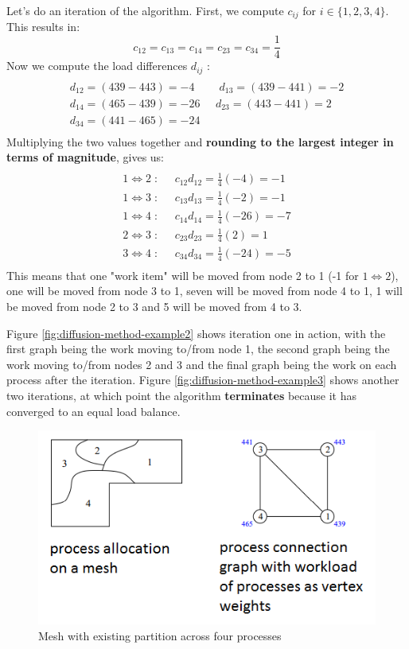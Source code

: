\documentclass{article}
\begin{document}
Let's do an iteration of the algorithm. First, we compute $c_{ij}$ for $i \in \lbrace 1, 2, 3, 4 \rbrace$. This results in:
\begin{equation}
	c_{12} = c_{13} = c_{14} = c_{23} = c_{34} = \frac{1}{4}
\end{equation}
Now we compute the load differences $d_{ij}$ :
\begin{multline} \\
	d_{12} = (439 - 443) = -4 \;\;\;\;\;\;\;\; d_{13} = (439 - 441) = -2 \\
	d_{14} = (465 - 439) = -26 \;\;\;\;\; d_{23} = (443 - 441) = 2 \\
	d_{34} = (441 - 465) = -24 \\
\end{multline}
Multiplying the two values together and \textbf{rounding to the largest integer in terms of magnitude}, gives us:
\begin{multline} \\
	1 \iff 2 \; : \;\;\;\;\; c_{12}d_{12} = \frac{1}{4}(-4) = -1 \\
	1 \iff 3 \; : \;\;\;\;\; c_{13}d_{13} = \frac{1}{4}(-2) = -1 \\
	1 \iff 4 \; : \;\;\;\;\; c_{14}d_{14} = \frac{1}{4}(-26) = -7 \\
	2 \iff 3 \; : \;\;\;\;\; c_{23}d_{23} = \frac{1}{4}(2) = 1 \\
	3 \iff 4 \; : \;\;\;\;\; c_{34}d_{34} = \frac{1}{4}(-24) = -5 \\
\end{multline}
This means that one "work item" will be moved from node 2 to 1 (-1 for $1 \iff 2$), one will be moved from node 3 to 1, seven will be moved from node 4 to 1, 1 will be moved from node 2 to 3 and 5 will be moved from 4 to 3.

Figure \ref{fig:diffusion-method-example2} shows iteration one in action, with the first graph being the work moving to/from node 1, the second graph being the work moving to/from nodes 2 and 3 and the final graph being the work on each process after the iteration. Figure \ref{fig:diffusion-method-example3} shows another two iterations, at which point the algorithm \textbf{terminates} because it has converged to an equal load balance.

\begin{figure}[H]
	\centering
	\includegraphics[scale=0.5]{figures/diffusion-method-example1.png}
	\caption{Mesh with existing partition across four processes}
	\label{fig:diffusion-method-example}
\end{figure}
\end{document}
